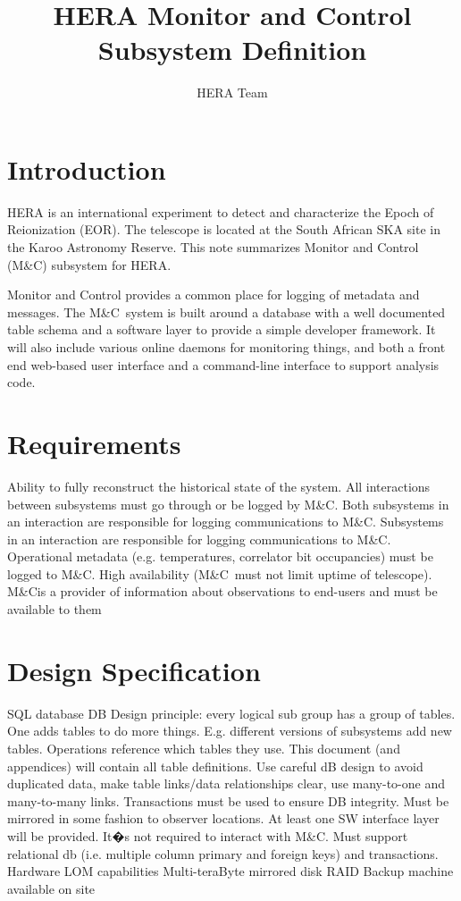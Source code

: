 \documentclass{article}
\newcommand{\mc}{M\&C}
\begin{document}
\author{HERA Team}
\title{HERA Monitor and Control Subsystem Definition}
\maketitle

\section{Introduction}
HERA is an international experiment to detect and characterize the Epoch of
Reionization (EOR).  The telescope is located at the South African SKA site in
the Karoo Astronomy Reserve.  This note summarizes Monitor and Control (\mc) subsystem for HERA.

Monitor and Control provides a common place for logging of metadata and messages. The \mc\ system is built around a database with a well documented table schema and a software layer to provide a simple developer framework. It will also include various online daemons for monitoring things, and both a front end web-based user interface and a command-line interface to support analysis code.

\section{Requirements}
\begin{outline}[enumerate]
	\1 Ability to fully reconstruct the historical state of the system.
	\1 All interactions between subsystems must go through or be logged by \mc.
		\2 Both subsystems in an interaction are responsible for logging communications to \mc.
		\2 Subsystems in an interaction are responsible for logging communications to \mc.
	\1 Operational metadata (e.g. temperatures, correlator bit occupancies) must be logged to \mc.
	\1 High availability (\mc\ must not limit uptime of telescope).
	\1 \mc is a provider of information about observations to end-users and must be available to them
\end{outline}

\section{Design Specification}
\begin{outline}[enumerate]
	\1 SQL database
		\2 DB Design principle: every logical sub group has a group of tables.  One adds tables to do more things. E.g. different versions of subsystems add new tables. Operations reference which tables they use.
		\2 This document (and appendices) will contain all table definitions.
		\2 Use careful dB design to avoid duplicated data, make table links/data relationships clear, use many-to-one and many-to-many links.
		\2 Transactions must be used to ensure DB integrity.
		\2 Must be mirrored in some fashion to observer locations.
	\1 At least one SW interface layer will be provided.
		\2 It�s not required to interact with \mc.
		\2 Must support relational db (i.e. multiple column primary and foreign keys) and transactions.
	\1 Hardware
		\2 LOM capabilities
		\2 Multi-teraByte mirrored disk RAID
		\2 Backup machine available on site
\end{outline}
\end{document}
